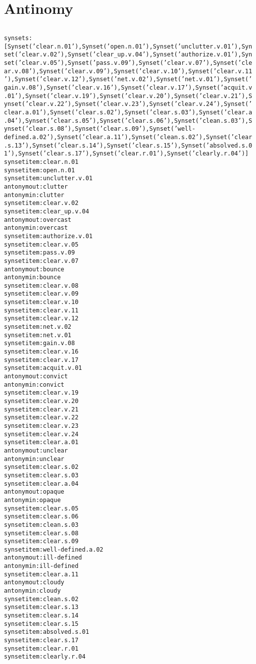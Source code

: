 \inputminted[firstline=192,lastline=208]{python}{back/code/textsurfer.py}

\section{Antinomy}

\inputminted[firstline=110,lastline=119]{python}{back/code/textsurfer.py}
% 

\begin{alltt}
synsets:
[Synset('clear.n.01'), Synset('open.n.01'), Synset('unclutter.v.01'), Synset('clear.v.02'), Synset('clear_up.v.04'), Synset('authorize.v.01'), Synset('clear.v.05'), Synset('pass.v.09'), Synset('clear.v.07'), Synset('clear.v.08'), Synset('clear.v.09'), Synset('clear.v.10'), Synset('clear.v.11'), Synset('clear.v.12'), Synset('net.v.02'), Synset('net.v.01'), Synset('gain.v.08'), Synset('clear.v.16'), Synset('clear.v.17'), Synset('acquit.v.01'), Synset('clear.v.19'), Synset('clear.v.20'), Synset('clear.v.21'), Synset('clear.v.22'), Synset('clear.v.23'), Synset('clear.v.24'), Synset('clear.a.01'), Synset('clear.s.02'), Synset('clear.s.03'), Synset('clear.a.04'), Synset('clear.s.05'), Synset('clear.s.06'), Synset('clean.s.03'), Synset('clear.s.08'), Synset('clear.s.09'), Synset('well-defined.a.02'), Synset('clear.a.11'), Synset('clean.s.02'), Synset('clear.s.13'), Synset('clear.s.14'), Synset('clear.s.15'), Synset('absolved.s.01'), Synset('clear.s.17'), Synset('clear.r.01'), Synset('clearly.r.04')]% chktex 36
synset item:clear.n.01
synset item:open.n.01
synset item:unclutter.v.01
antonym out:clutter
antonym in:clutter
synset item:clear.v.02
synset item:clear_up.v.04
antonym out:overcast
antonym in:overcast
synset item:authorize.v.01
synset item:clear.v.05
synset item:pass.v.09
synset item:clear.v.07
antonym out:bounce
antonym in:bounce
synset item:clear.v.08
synset item:clear.v.09
synset item:clear.v.10
synset item:clear.v.11
synset item:clear.v.12
synset item:net.v.02
synset item:net.v.01
synset item:gain.v.08
synset item:clear.v.16
synset item:clear.v.17
synset item:acquit.v.01
antonym out:convict
antonym in:convict
synset item:clear.v.19
synset item:clear.v.20
synset item:clear.v.21
synset item:clear.v.22
synset item:clear.v.23
synset item:clear.v.24
synset item:clear.a.01
antonym out:unclear
antonym in:unclear
synset item:clear.s.02
synset item:clear.s.03
synset item:clear.a.04
antonym out:opaque
antonym in:opaque
synset item:clear.s.05
synset item:clear.s.06
synset item:clean.s.03
synset item:clear.s.08
synset item:clear.s.09
synset item:well-defined.a.02
antonym out:ill-defined
antonym in:ill-defined
synset item:clear.a.11
antonym out:cloudy
antonym in:cloudy
synset item:clean.s.02
synset item:clear.s.13
synset item:clear.s.14
synset item:clear.s.15
synset item:absolved.s.01
synset item:clear.s.17
synset item:clear.r.01
synset item:clearly.r.04
\end{alltt}

